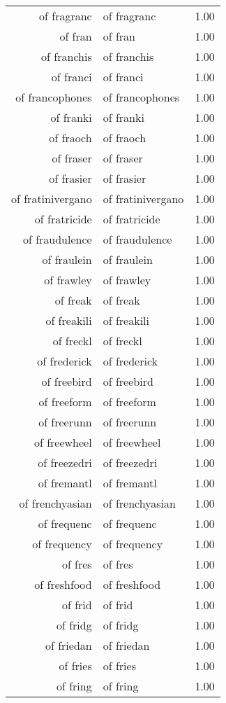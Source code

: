 \begin{table}[ht]
\begin{tabular}{rlr}
  of fragranc & of fragranc & 1.00 \\ 
  of fran & of fran & 1.00 \\ 
  of franchis & of franchis & 1.00 \\ 
  of franci & of franci & 1.00 \\ 
  of francophones & of francophones & 1.00 \\ 
  of franki & of franki & 1.00 \\ 
  of fraoch & of fraoch & 1.00 \\ 
  of fraser & of fraser & 1.00 \\ 
  of frasier & of frasier & 1.00 \\ 
  of fratinivergano & of fratinivergano & 1.00 \\ 
  of fratricide & of fratricide & 1.00 \\ 
  of fraudulence & of fraudulence & 1.00 \\ 
  of fraulein & of fraulein & 1.00 \\ 
  of frawley & of frawley & 1.00 \\ 
  of freak & of freak & 1.00 \\ 
  of freakili & of freakili & 1.00 \\ 
  of freckl & of freckl & 1.00 \\ 
  of frederick & of frederick & 1.00 \\ 
  of freebird & of freebird & 1.00 \\ 
  of freeform & of freeform & 1.00 \\ 
  of freerunn & of freerunn & 1.00 \\ 
  of freewheel & of freewheel & 1.00 \\ 
  of freezedri & of freezedri & 1.00 \\ 
  of fremantl & of fremantl & 1.00 \\ 
  of frenchyasian & of frenchyasian & 1.00 \\ 
  of frequenc & of frequenc & 1.00 \\ 
  of frequency & of frequency & 1.00 \\ 
  of fres & of fres & 1.00 \\ 
  of freshfood & of freshfood & 1.00 \\ 
  of frid & of frid & 1.00 \\ 
  of fridg & of fridg & 1.00 \\ 
  of friedan & of friedan & 1.00 \\ 
  of fries & of fries & 1.00 \\ 
  of fring & of fring & 1.00 \\ 

\end{tabular}
\end{table}
